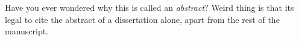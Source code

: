 
Have you ever wondered why this is called an \emph{abstract}? Weird thing is
that its legal to cite the abstract of a dissertation alone, apart from the
rest of the manuscript.
